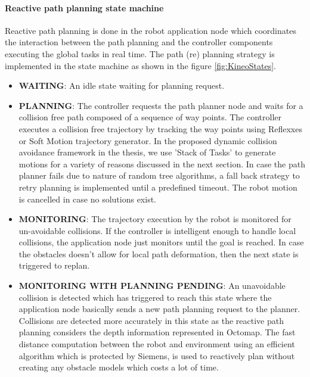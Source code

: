 \paragraph{Reactive path planning state machine}
Reactive path planning is done in the robot application node which coordinates the interaction between the path planning and the controller components executing the global tasks in real time. The path (re) planning strategy is implemented in the state machine as shown in the figure \ref{fig:KineoStates}.
\begin{itemize}
  \item \textbf{WAITING}: An idle state waiting for planning request.
  \item \textbf{PLANNING}: The controller requests the path planner node and waits for a collision free path composed of a sequence of way points. The controller executes a collision free trajectory by tracking the way points using Reflexxes or Soft Motion trajectory generator. In the proposed dynamic collision avoidance framework in the thesis, we use 'Stack of Tasks' to generate motions for a variety of reasons discussed in the next section.  In case the path planner fails due to nature of random tree algorithms, a fall back strategy to retry planning is implemented until a predefined timeout. The robot motion is cancelled in case no solutions exist.
  \item \textbf{MONITORING}: The trajectory execution by the robot is monitored for un-avoidable collisions. If the controller is intelligent enough to handle local collisions, the application node just monitors until the goal is reached. In case the obstacles doesn't allow for local path deformation, then the next state is triggered to replan.  
  \item \textbf{MONITORING WITH PLANNING PENDING}: An unavoidable collision is detected which has triggered to reach this state where the application node basically sends a new path planning request to the planner. Collisions are detected more accurately in this state as the reactive path planning considers the depth information represented in Octomap. The fast distance computation between the robot and environment using an efficient algorithm which is protected by Siemens, is used to reactively plan without creating any obstacle models which costs a lot of time.        
\end{itemize}

